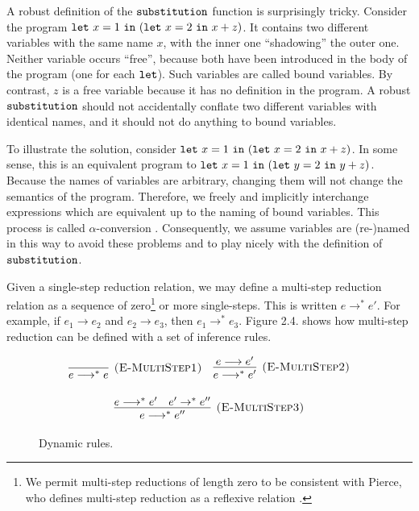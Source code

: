 A robust definition of the $\mathtt{substitution}$ function is surprisingly tricky. Consider the program $\mathtt{let}~ x = 1~\mathtt{in}~ (\mathtt{let}~ x = 2~\mathtt{in}~ x+z)$. It contains two different variables with the same name $x$, with the inner one ``shadowing'' the outer one. Neither variable occurs ``free'', because both have been introduced in the body of the program (one for each $\mathtt{let}$). Such variables are called bound variables. By contrast, $z$ is a free variable because it has no definition in the program. A robust $\mathtt{substitution}$ should not accidentally conflate two different variables with identical names, and it should not do anything to bound variables.

To illustrate the solution, consider $\mathtt{let}~ x = 1~\mathtt{in}~ (\mathtt{let}~ x = 2~\mathtt{in}~ x+z)$. In some sense, this is an equivalent program to $\mathtt{let}~ x = 1~\mathtt{in}~ (\mathtt{let}~ y = 2~\mathtt{in}~ y+z)$. Because the names of variables are arbitrary, changing them will not change the semantics of the program. Therefore, we freely and implicitly interchange expressions which are equivalent up to the naming of bound variables. This process is called $\alpha$-conversion \cite[p. 71]{tapl}. Consequently, we assume variables are (re-)named in this way to avoid these problems and to play nicely with the definition of $\mathtt{substitution}$.

Given a single-step reduction relation, we may define a multi-step reduction relation as a sequence of zero\footnote{We permit multi-step reductions of length zero to be consistent with Pierce, who defines multi-step reduction as a reflexive relation \cite[p. 39]{tapl}.} or more single-steps. This is written $e \longrightarrow^* e'$. For example, if $e_1 \longrightarrow e_2$ and $e_2 \longrightarrow e_3$, then $e_1 \longrightarrow^* e_3$. Figure 2.4. shows how multi-step reduction can be defined with a set of inference rules.

\begin{figure}[h]

\noindent
{}

\[
\begin{array}{c}

\infer[\textsc{(E-MultiStep1)}]
	{ e \longrightarrow^{*}  e}
	{}
~~~
\infer[\textsc{(E-MultiStep2)}]
	{ e \longrightarrow^{*}  e'}
	{ e \longrightarrow  e'} \\[3ex]
	
\infer[\textsc{(E-MultiStep3)}]
	{e \longrightarrow^{*}  e''}
	{ e \longrightarrow^{*}  e' &  e' \rightarrow^{*}  e''}
\end{array}
\]
\vspace{-12pt}
\caption{Dynamic rules.}
\label{This is the label.}
\end{figure}





